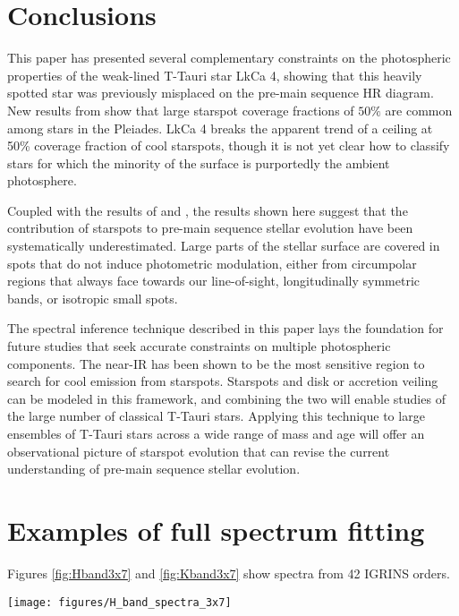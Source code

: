 \documentclass[12pt]{report}
\begin{document}
\section{Conclusions}
This paper has presented several complementary constraints on the photospheric properties of the weak-lined T-Tauri star LkCa 4, showing that this heavily spotted star was previously misplaced on the pre-main sequence HR diagram.  New results from \citet{fang2016} show that large starspot coverage fractions of $50\%$ are common among stars in the Pleiades.  LkCa 4 breaks the apparent trend of a ceiling at 50\% coverage fraction of cool starspots, though it is not yet clear how to classify stars for which the minority of the surface is purportedly the ambient photosphere.

Coupled with the results of \citet{fang2016} and \citet{covey16}, the results shown here suggest that the contribution of starspots to pre-main sequence stellar evolution have been systematically underestimated.  Large parts of the stellar surface are covered in spots that do not induce photometric modulation, either from circumpolar regions that always face towards our line-of-sight, longitudinally symmetric bands, or isotropic small spots.

The spectral inference technique described in this paper lays the foundation for future studies that seek accurate constraints on multiple photospheric components.  The near-IR has been shown to be the most sensitive region to search for cool emission from starspots.  Starspots and disk or accretion veiling can be modeled in this framework, and combining the two will enable studies of the large number of classical T-Tauri stars.  Applying this technique to large ensembles of T-Tauri stars across a wide range of mass and age will offer an observational picture of starspot evolution that can revise the current understanding of pre-main sequence stellar evolution.  


\clearpage
\pagebreak


\appendix

\section{Examples of full spectrum fitting}

Figures \ref{fig:Hband3x7} and \ref{fig:Kband3x7} show spectra from 42 IGRINS orders.


\begin{figure*}
 \centering
 \texttt{[image: figures/H\_band\_spectra\_3x7]}
 \caption[$H-$band IGRINS spectra]{IGRINS Orders 94 and $99-119$.  Note that the $y-$axis is on a logarithmic scale.  The red line is the cool photosphere while the blue line is the hot photosphere.  The purple line is the composite mixture model.}
 \label{fig:Hband3x7}
\end{figure*}
\end{document}
